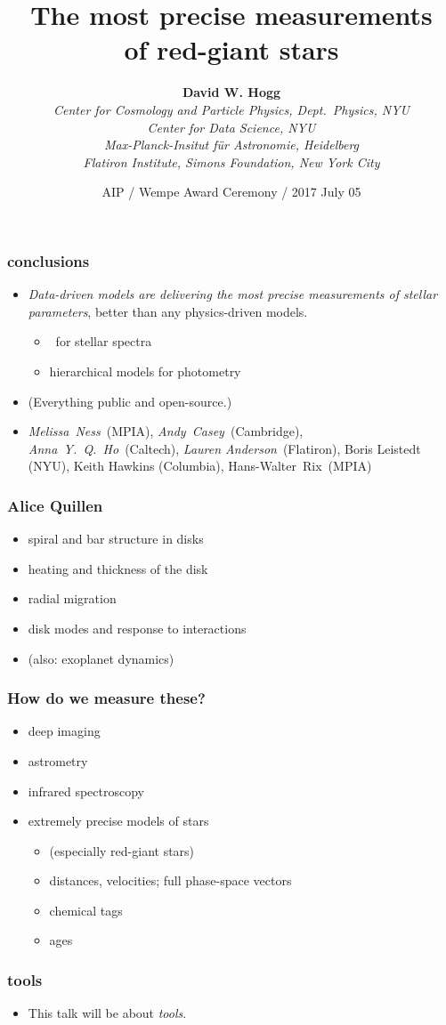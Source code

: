 \documentclass[pdftex]{beamer}
\title{The most precise measurements\\ of red-giant stars}
\author[David W. Hogg (NYU)]{\textbf{David W. Hogg} \\
  \textsl{\footnotesize Center for Cosmology and Particle Physics, Dept.~Physics, NYU} \\
  \textsl{\footnotesize Center for Data Science, NYU} \\
  \textsl{\footnotesize Max-Planck-Insitut f\"ur Astronomie, Heidelberg} \\
  \textsl{\footnotesize Flatiron Institute, Simons Foundation, New York City}}
\date{AIP / Wempe Award Ceremony / 2017 July 05}
\newcommand{\conclusions}{%
\begin{frame}
  \frametitle{conclusions}
  \begin{itemize}
  \item \emph{Data-driven models are delivering the most precise measurements
    of stellar parameters}, better than any physics-driven models.
    \begin{itemize}
    \item \tc\ for stellar spectra
    \item hierarchical models for photometry
    \end{itemize}
  \item (Everything public and open-source.)
  \item \emph{Melissa~Ness}~(MPIA), \emph{Andy~Casey}~(Cambridge), \emph{Anna~Y.~Q.~Ho}~(Caltech), \emph{Lauren Anderson}~(Flatiron), Boris Leistedt (NYU), Keith Hawkins (Columbia), Hans-Walter~Rix~(MPIA)
  \end{itemize}
\end{frame}}
\begin{document}
\sloppy\sloppypar\raggedright\raggedbottom

\begin{frame}
  \titlepage
\end{frame}

\conclusions

\begin{frame}
  \frametitle{Alice Quillen}
  \begin{itemize}
  \item spiral and bar structure in disks
  \item heating and thickness of the disk
  \item radial migration
  \item disk modes and response to interactions
  \item (also: exoplanet dynamics)
  \end{itemize}
\end{frame}

\begin{frame}
  \frametitle{How do we measure these?}
  \begin{itemize}
  \item deep imaging
  \item astrometry
  \item infrared spectroscopy
  \item extremely precise models of stars
    \begin{itemize}
    \item (especially red-giant stars)
    \item distances, velocities; full phase-space vectors
    \item chemical tags
    \item ages
    \end{itemize}
  \end{itemize}
\end{frame}

\begin{frame}
  \frametitle{tools}
  \begin{itemize}
  \item This talk will be about \emph{tools}.
  \end{itemize}
\end{frame}
\end{document}
